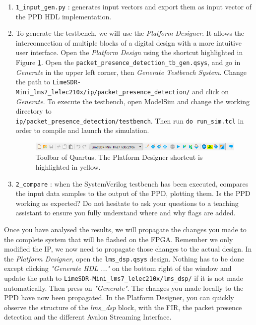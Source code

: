 \begin{enumerate}
    \item \texttt{1\_input\_gen.py} : generates input vectors and export them as input vector of the PPD HDL implementation.

    \item To generate the testbench, we will use the \textit{Platform Designer}. It allows the interconnection of multiple blocks of a digital design with a more intuitive user interface. Open the \textit{Platform Design} using the shortcut highlighted in Figure \ref{fig:quartus_platform_designer}. Open the \texttt{packet\_presence\_detection\_tb\_gen.qsys}, and go in \textit{Generate} in the upper left corner, then \textit{Generate Testbench System}. Change the path to \texttt{LimeSDR-Mini\_lms7\_lelec210x/ip/packet\_presence\_detection/} and click on \textit{Generate}. To execute the testbench, open ModelSim and change the working directory to\\ \texttt{ip/packet\_presence\_detection/testbench}. Then run \texttt{do run\_sim.tcl} in order to compile and launch the simulation.

\begin{figure}[H]
    \centering
    \includegraphics[scale=0.7]{figures/quartus_toolbar.PNG}
    \caption{Toolbar of Quartus. The Platform Designer shortcut is highlighted in yellow.}
    \label{fig:quartus_platform_designer}
\end{figure}

    \item \texttt{2\_compare} : when the SystemVerilog testbench has been executed, compares the input data samples to the output of the PPD, plotting them. Is the PPD working as expected? Do not hesitate to ask your questions to a teaching assistant to ensure you fully understand where and why flags are added.
\end{enumerate}

Once you have analysed the results, we will propagate the changes you made to the complete system that will be flashed on the FPGA. Remember we only modified the IP, we now need to propagate those changes to the actual design. In the \textit{Platform Designer}, open the \texttt{lms\_dsp.qsys} design. Nothing has to be done except clicking \textit{"Generate HDL ..."} on the bottom right of the window and update the path to
\texttt{LimeSDR-Mini\_lms7\_lelec210x/lms\_dsp/} if it is not made automatically. Then press on \textit{"Generate"}. The changes you made locally to the PPD have now been propagated. In the Platform Designer, you can quickly observe the structure of the \textit{lms\_dsp} block, with the FIR, the packet presence detection and the different Avalon Streaming Interface.


